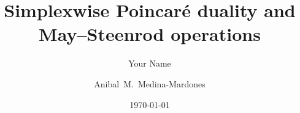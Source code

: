 \documentclass{amsart}
\title{Simplexwise Poincar\'e duality and May--Steenrod operations}
\author[short version of name]{Your Name}
\author[A.M.~Medina-Mardones]{Anibal~M.~Medina-Mardones}
\date{\today}
\begin{document}
	
	\maketitle
	
	
	
	
	
	
	
	
	
%	
%	
	\sloppy
	\printbibliography
\end{document}
